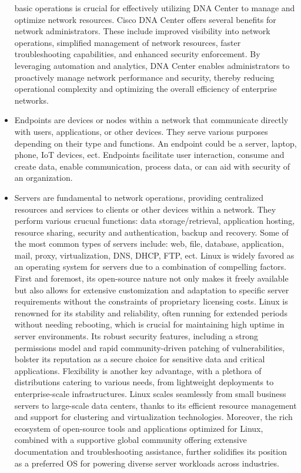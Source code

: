 \documentclass{article}
\begin{document}
\begin{itemize}
basic operations is crucial for effectively utilizing DNA Center to manage and optimize network resources. Cisco DNA Center offers several benefits for network administrators. These include improved visibility into network operations, simplified management of network resources, faster troubleshooting capabilities, and enhanced security enforcement. By leveraging automation and analytics, DNA Center enables administrators to proactively manage network performance and security, thereby reducing operational complexity and optimizing the overall efficiency of enterprise networks.
	\item[] Endpoints are devices or nodes within a network that communicate directly with users, applications, or other devices. They serve various purposes depending on their type and functions. An endpoint could be a server, laptop, phone, IoT devices, ect. Endpoints facilitate user interaction, consume and create data, enable communication, process data, or can aid with security of an organization.
	\item[] Servers are fundamental to network operations, providing centralized resources and services to clients or other devices within a network. They perform various crucual functions: data storage/retrieval, application hosting, resource sharing, security and authentication, backup and recovery. Some of the most common types of servers include: web, file, database, application, mail, proxy, virtualization, DNS, DHCP, FTP, ect. Linux is widely favored as an operating system for servers due to a combination of compelling factors. First and foremost, its open-source nature not only makes it freely available but also allows for extensive customization and adaptation to specific server requirements without the constraints of proprietary licensing costs. Linux is renowned for its stability and reliability, often running for extended periods without needing rebooting, which is crucial for maintaining high uptime in server environments. Its robust security features, including a strong permissions model and rapid community-driven patching of vulnerabilities, bolster its reputation as a secure choice for sensitive data and critical applications. Flexibility is another key advantage, with a plethora of distributions catering to various needs, from lightweight deployments to enterprise-scale infrastructures. Linux scales seamlessly from small business servers to large-scale data centers, thanks to its efficient resource management and support for clustering and virtualization technologies. Moreover, the rich ecosystem of open-source tools and applications optimized for Linux, combined with a supportive global community offering extensive documentation and troubleshooting assistance, further solidifies its position as a preferred OS for powering diverse server workloads across industries.

\end{itemize}
\end{document}
